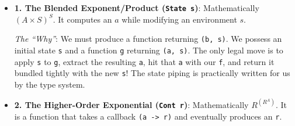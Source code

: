 \documentclass[
]{article}
\newenvironment{Shaded}{}{}
\newcommand{\DataTypeTok}[1]{\textcolor[rgb]{0.56,0.13,0.00}{#1}}
\newcommand{\FunctionTok}[1]{\textcolor[rgb]{0.02,0.16,0.49}{#1}}
\newcommand{\KeywordTok}[1]{\textcolor[rgb]{0.00,0.44,0.13}{\textbf{#1}}}
\newcommand{\NormalTok}[1]{#1}
\newcommand{\OperatorTok}[1]{\textcolor[rgb]{0.40,0.40,0.40}{#1}}
\newcommand{\OtherTok}[1]{\textcolor[rgb]{0.00,0.44,0.13}{#1}}
\begin{document}
\begin{itemize}
\item
  \textbf{1. The Blended Exponent/Product (\texttt{State\ s})}:
  Mathematically \((A \times S)^S\). It computes an \(a\) while
  modifying an environment \(s\).

\begin{Shaded}
\end{Shaded}

  \emph{The ``Why''}: We must produce a function returning
  \texttt{(b,\ s)}. We possess an initial state \texttt{s} and a
  function \texttt{g} returning \texttt{(a,\ s)}. The only legal move is
  to apply \texttt{s} to \texttt{g}, extract the resulting \texttt{a},
  hit that \texttt{a} with our \texttt{f}, and return it bundled tightly
  with the new \texttt{s}! The state piping is practically written for
  us by the type system.
\item
  \textbf{2. The Higher-Order Exponential (\texttt{Cont\ r})}:
  Mathematically \(R^{(R^A)}\). It is a function that takes a callback
  \texttt{(a\ -\textgreater{}\ r)} and eventually produces an
  \texttt{r}.

\begin{Shaded}
\end{Shaded}


\end{itemize}
\end{document}
